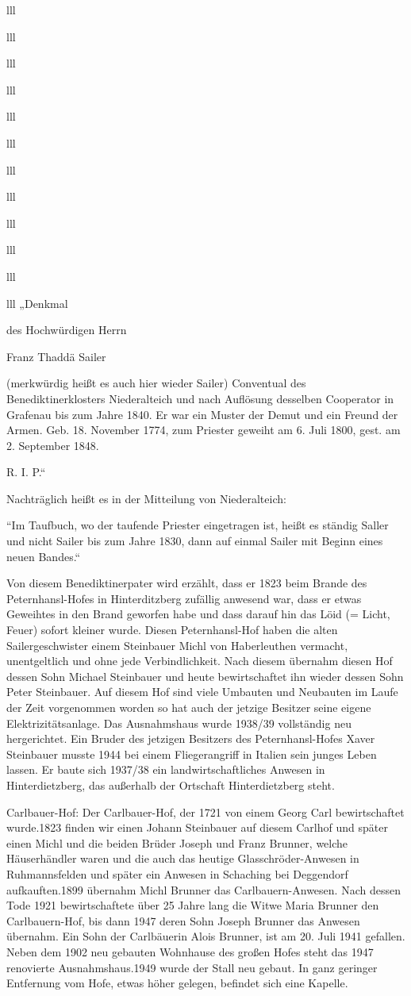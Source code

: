 \documentclass[12pt,a4pager]{book}
\begin{document}
\begin{tabuluar}{lll}
\begin{tabuluar}{lll}
\begin{tabuluar}{lll}
\begin{tabuluar}{lll}
\begin{tabuluar}{lll}
\begin{tabuluar}{lll}
\begin{tabuluar}{lll}
\begin{tabuluar}{lll}
\begin{tabuluar}{lll}
\begin{tabuluar}{lll}
\begin{tabuluar}{lll}
\begin{tabuluar}{lll}
„Denkmal

des Hochwürdigen Herrn

Franz Thaddä Sailer

(merkwürdig heißt es auch hier wieder Sailer) Conventual des
Benediktinerklosters Niederalteich und nach Auflösung desselben Cooperator in
Grafenau bis zum Jahre 1840. Er war ein Muster der Demut und ein Freund der
Armen. Geb. 18. November 1774, zum Priester geweiht am 6. Juli 1800, gest. am 2.
September 1848.

R. I. P.“

Nachträglich heißt es in der Mitteilung von Niederalteich:

“Im Taufbuch, wo der taufende Priester eingetragen ist, heißt es ständig Saller
und nicht Sailer bis zum Jahre 1830, dann auf einmal Sailer mit Beginn eines
neuen Bandes.“

Von diesem Benediktinerpater wird erzählt, dass er 1823 beim Brande des
Peternhansl-Hofes in Hinterditzberg zufällig anwesend war, dass er etwas
Geweihtes in den Brand geworfen habe und dass darauf hin das Löid (= Licht,
Feuer) sofort kleiner wurde. Diesen Peternhansl-Hof haben die alten
Sailergeschwister einem Steinbauer Michl von Haberleuthen vermacht,
unentgeltlich und ohne jede Verbindlichkeit. Nach diesem übernahm diesen Hof
dessen Sohn Michael Steinbauer und heute bewirtschaftet ihn wieder dessen Sohn
Peter Steinbauer. Auf diesem Hof sind viele Umbauten und Neubauten im Laufe der
Zeit vorgenommen worden so hat auch der jetzige Besitzer seine eigene
Elektrizitätsanlage. Das Ausnahmshaus wurde 1938/39 vollständig neu
hergerichtet. Ein Bruder des jetzigen Besitzers des Peternhansl-Hofes Xaver
Steinbauer musste 1944 bei einem Fliegerangriff in Italien sein junges Leben
lassen. Er baute sich 1937/38 ein landwirtschaftliches Anwesen in
Hinterdietzberg, das außerhalb der Ortschaft Hinterdietzberg steht.

Carlbauer-Hof: Der Carlbauer-Hof, der 1721 von einem Georg Carl bewirtschaftet
wurde.1823 finden wir einen Johann Steinbauer auf diesem Carlhof und später
einen Michl und die beiden Brüder Joseph und Franz Brunner, welche Häuserhändler
waren und die auch das heutige Glasschröder-Anwesen in Ruhmannsfelden und später
ein Anwesen in Schaching bei Deggendorf aufkauften.1899 übernahm Michl Brunner
das Carlbauern-Anwesen. Nach dessen Tode 1921 bewirtschaftete über 25 Jahre lang
die Witwe Maria Brunner den Carlbauern-Hof, bis dann 1947 deren Sohn Joseph
Brunner das Anwesen übernahm. Ein Sohn der Carlbäuerin Alois Brunner, ist am 20.
Juli 1941 gefallen. Neben dem 1902 neu gebauten Wohnhause des großen Hofes steht
das 1947 renovierte Ausnahmshaus.1949 wurde der Stall neu gebaut. In ganz
geringer Entfernung vom Hofe, etwas höher gelegen, befindet sich eine Kapelle.


\end{tabuluar}
\end{tabuluar}
\end{tabuluar}
\end{tabuluar}
\end{tabuluar}
\end{tabuluar}
\end{tabuluar}
\end{tabuluar}
\end{tabuluar}
\end{tabuluar}
\end{tabuluar}
\end{tabuluar}
\end{document}
